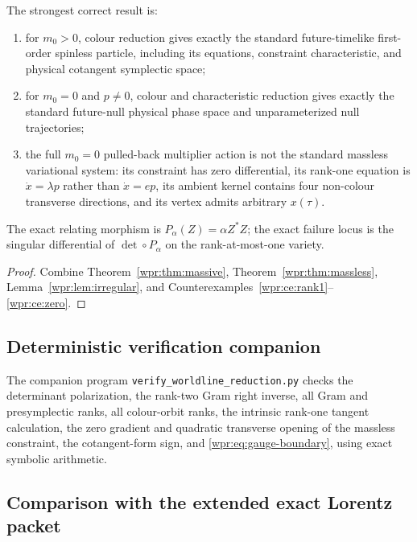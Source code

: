 \begin{theorem}
\label{wpr:thm:verdict}
The strongest correct result is:
\begin{enumerate}[label=\textup{(\arabic*)}]
\item for \(m_0>0\), colour reduction gives exactly the standard
future-timelike first-order spinless particle, including its equations,
constraint characteristic, and physical cotangent symplectic space;
\item for \(m_0=0\) and \(p\neq0\), colour and characteristic reduction
gives exactly the standard future-null physical phase space and
unparameterized null trajectories;
\item the full \(m_0=0\) pulled-back multiplier action is not the
standard massless variational system: its constraint has zero
differential, its rank-one equation is \(\dot x=\lambda p\) rather
than \(\dot x=e p\), its ambient kernel contains four non-colour
transverse directions, and its vertex admits arbitrary \(x(\tau)\).
\end{enumerate}
The exact relating morphism is \(P_\alpha(Z)=\alpha Z^*Z\); the exact
failure locus is the singular differential of
\(\det\circ P_\alpha\) on the rank-at-most-one variety.
\end{theorem}
\begin{proof}
Combine Theorem~\ref{wpr:thm:massive},
Theorem~\ref{wpr:thm:massless},
Lemma~\ref{wpr:lem:irregular}, and
Counterexamples~\ref{wpr:ce:rank1}--\ref{wpr:ce:zero}.
\end{proof}

\subsection{Deterministic verification companion}
The companion program
\texttt{verify\_worldline\_reduction.py} checks the determinant
polarization, the rank-two Gram right inverse, all Gram and
presymplectic ranks, all colour-orbit ranks, the intrinsic rank-one
tangent calculation, the zero gradient and quadratic transverse
opening of the massless constraint, the cotangent-form sign, and
\eqref{wpr:eq:gauge-boundary}, using exact symbolic arithmetic.

\subsection{Comparison with the extended exact Lorentz packet}
\label{wpr:app:packet}


